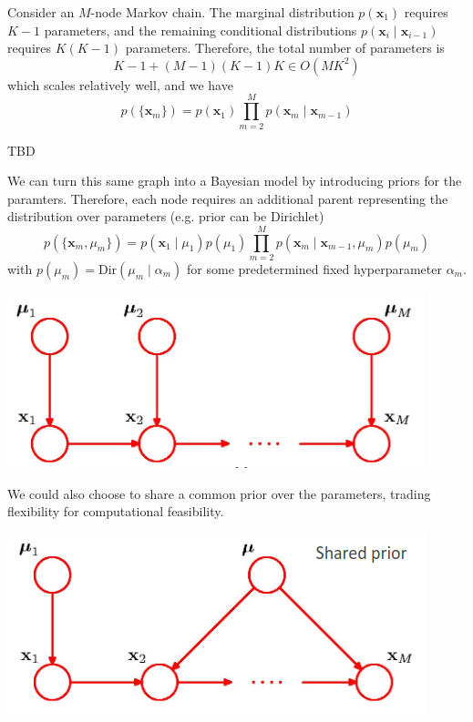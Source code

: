     \begin{example}
      Consider an $M$-node Markov chain. The marginal distribution $p(\mathbf{x}_1)$ requires $K-1$ parameters, and the remaining conditional distributions $p(\mathbf{x}_i \mid \mathbf{x}_{i-1})$ requires $K(K-1)$ parameters. Therefore, the total number of parameters is 
      \[K-1 + (M-1) (K-1) K \in O(M K^2)\]
      which scales relatively well, and we have 
      \[p(\{\mathbf{x}_m\}) = p (\mathbf{x}_1) \prod_{m=2}^M p(\mathbf{x}_m \mid \mathbf{x}_{m-1})\]
    \begin{center}
      TBD
    \end{center}
    We can turn this same graph into a Bayesian model by introducing priors for the paramters. Therefore, each node requires an additional parent representing the distribution over parameters (e.g. prior can be Dirichlet)  
    \[p(\{\mathbf{x}_m , \mu_m\}) = p(\mathbf{x}_1 \mid \mu_1) p(\mu_1) \prod_{m=2}^M p(\mathbf{x}_m \mid \mathbf{x}_{m-1}, \mu_m) p(\mu_m) \]
    with $p(\mu_m) = \mathrm{Dir}(\mu_m \mid \alpha_m)$ for some predetermined fixed hyperparameter $\alpha_m$. 
    \begin{center}
      \includegraphics[scale=0.5]{img/07_Boltzmann/dir_prior.png}
    \end{center}
    We could also choose to share a common prior over the parameters, trading flexibility for computational feasibility. 
    \begin{center}
      \includegraphics[scale=0.5]{img/07_Boltzmann/shared_dir_prior.png}
    \end{center}
    \end{example}

